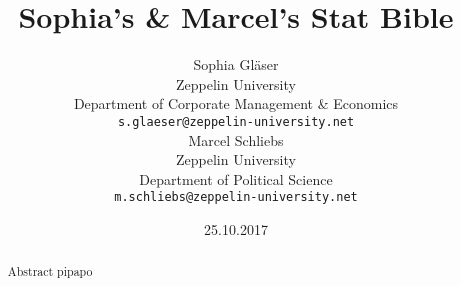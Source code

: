 \title{Sophia's \& Marcel's Stat Bible}

\author{Sophia Gläser\\
  Zeppelin University\\
  Department of Corporate Management \& Economics\\
  {\tt s.glaeser@zeppelin-university.net} \\\And
  Marcel Schliebs \\
  Zeppelin University\\
  Department of Political Science\\
  {\tt m.schliebs@zeppelin-university.net} \\}

\date{25.10.2017}

\maketitle

\begin{abstract}
Abstract pipapo
\end{abstract}
